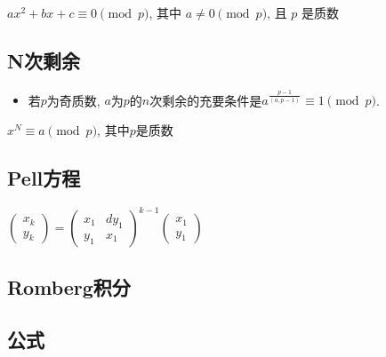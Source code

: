 \documentclass[landscape, twocolumn, 8pt, a4paper, twoside]{extarticle}
\begin{document}
    $ax^2 + bx + c \equiv 0 \pmod{p}$, 其中 $a \ne 0 \pmod{p}$, 且 $p$ 是质数
    
  
  \subsection{N次剩余}
    \begin{itemize}
    \item 若$p$为奇质数, $a$为$p$的$n$次剩余的充要条件是$a^{\frac{p - 1}{(a, p - 1)}} \equiv 1 \pmod{p}$.
    \end{itemize}
    $x^N \equiv a \pmod{p}$, 其中$p$是质数
    

  \subsection{Pell方程}
    $\begin{pmatrix}
    x_k \\ y_k
    \end{pmatrix} = 
    \begin{pmatrix}
    x_1 & dy_1 \\
    y_1 & x_1
    \end{pmatrix} ^ {k - 1}
    \begin{pmatrix}
    x_1 \\ y_1
    \end{pmatrix}
    $

    

  \subsection{Romberg积分}
    

  \subsection{公式}
\end{document}
